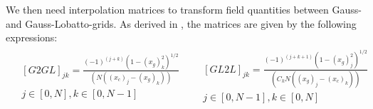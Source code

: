 \documentclass{article}
\begin{document}
We then need interpolation matrices to transform field quantities between Gauss- and Gauss-Lobatto-grids. As derived in \cite{khorrami1991chebyshev}, the matrices are given by the following expressions:
\begin{subequations}
 \begin{align}\label{def:G2GL}
 \begin{split}
  &[G2GL]_{jk} = \frac{(-1)^{(j + k)} (1- (x_{g})_{k}^{2})^{1/2}}{(N((x_{c})_{j} - (x_{g})_{k}))}\\
  &j \in [0, N],  k \in[0, N-1]
 \end{split}
 \end{align}
 \begin{align}\label{def:GL2L}
  \begin{split}
  &[GL2L]_{jk} = \frac{(-1)^{(j + k + 1)} (1- (x_{g})_{j}^{2})^{1/2}}{(C_{k}N((x_{g})_{j} - (x_{c})_{k}))}\\
  &j \in [0, N-1],  k \in[0, N]
  \end{split}
 \end{align}
\end{subequations}
\end{document}
